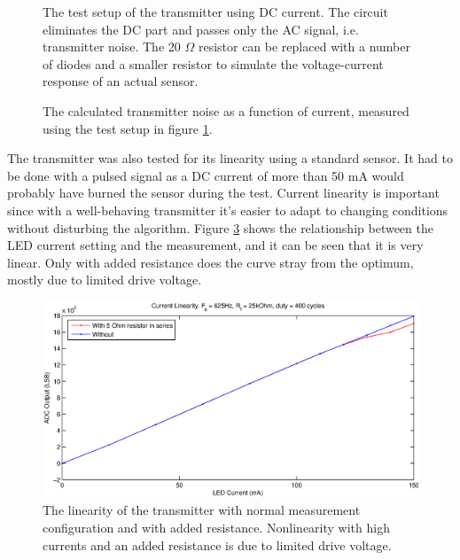 \begin{figure}[htcb]
\begin{center}
  
  \caption{The test setup of the transmitter using DC current. The circuit eliminates the DC part and passes only the AC signal, i.e. transmitter noise. The 20 $\Omega$ resistor can be replaced with a number of diodes and a smaller resistor to simulate the voltage-current response of an actual sensor.}
  \label{fig:tx_dc_test_setup}
\end{center}
\end{figure}

\begin{figure}[htcb]
\begin{center}
	
  \caption{The calculated transmitter noise as a function of current, measured using the test setup in figure \ref{fig:tx_dc_test_setup}.}
  \label{fig:tx_dc_noise}
\end{center}
\end{figure}

The transmitter was also tested for its linearity using a standard sensor. It had to be done with a pulsed signal as a DC current of more than 50 mA would probably have burned the sensor during the test. Current linearity is important since with a well-behaving transmitter it's easier to adapt to changing conditions without disturbing the \spo algorithm. Figure \ref{fig:current_linearity} shows the relationship between the LED current setting and the measurement, and it can be seen that it is very linear. Only with added resistance does the curve stray from the optimum, mostly due to limited drive voltage.

\begin{figure}[cb]
  \begin{center}
    \includegraphics[scale=0.7]{kuvat/measurements/current_linearity.eps}
    \caption{The linearity of the transmitter with normal measurement configuration and with added resistance. Nonlinearity with high currents and an added resistance is due to limited drive voltage.}
    \label{fig:current_linearity}
  \end{center}
\end{figure}

